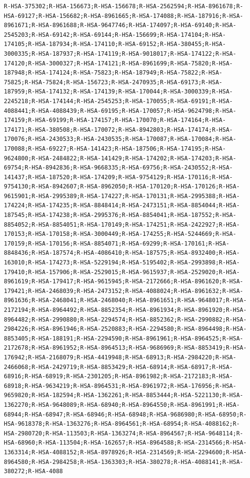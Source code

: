 \documentclass[
  letterpaper,
  DIV=11,
  numbers=noendperiod]{scrartcl}
\begin{document}
\begin{verbatim}
R-HSA-375302;R-HSA-156673;R-HSA-156678;R-HSA-2562594;R-HSA-8961678;R-HSA-69127;R-HSA-156682;R-HSA-8961665;R-HSA-174088;R-HSA-187916;R-HSA-8961671;R-HSA-8961688;R-HSA-9647746;R-HSA-174097;R-HSA-69140;R-HSA-2545203;R-HSA-69142;R-HSA-69144;R-HSA-156699;R-HSA-174104;R-HSA-174105;R-HSA-187934;R-HSA-174110;R-HSA-69152;R-HSA-380455;R-HSA-3000335;R-HSA-187937;R-HSA-174119;R-HSA-9018017;R-HSA-174122;R-HSA-174120;R-HSA-3000327;R-HSA-174121;R-HSA-8961699;R-HSA-75820;R-HSA-187948;R-HSA-174124;R-HSA-75823;R-HSA-187949;R-HSA-75822;R-HSA-75825;R-HSA-75824;R-HSA-156723;R-HSA-2470935;R-HSA-69173;R-HSA-187959;R-HSA-174132;R-HSA-174139;R-HSA-170044;R-HSA-3000339;R-HSA-2245218;R-HSA-174144;R-HSA-2545253;R-HSA-170055;R-HSA-69191;R-HSA-4088441;R-HSA-4088439;R-HSA-69195;R-HSA-170057;R-HSA-9624798;R-HSA-174159;R-HSA-69199;R-HSA-174157;R-HSA-170070;R-HSA-174164;R-HSA-174171;R-HSA-380508;R-HSA-170072;R-HSA-8942803;R-HSA-174174;R-HSA-170076;R-HSA-2430533;R-HSA-2430535;R-HSA-170087;R-HSA-170084;R-HSA-170088;R-HSA-69227;R-HSA-141423;R-HSA-187506;R-HSA-174195;R-HSA-9624800;R-HSA-2484822;R-HSA-141429;R-HSA-174202;R-HSA-174203;R-HSA-69754;R-HSA-8942836;R-HSA-9668335;R-HSA-69756;R-HSA-2430552;R-HSA-141437;R-HSA-187520;R-HSA-174209;R-HSA-9754129;R-HSA-170116;R-HSA-9754130;R-HSA-8942607;R-HSA-8962050;R-HSA-170120;R-HSA-170126;R-HSA-9615901;R-HSA-2995389;R-HSA-174227;R-HSA-170131;R-HSA-2995388;R-HSA-174224;R-HSA-174235;R-HSA-8848414;R-HSA-2473151;R-HSA-8854044;R-HSA-187545;R-HSA-174238;R-HSA-2995376;R-HSA-8854041;R-HSA-187552;R-HSA-8854052;R-HSA-8854051;R-HSA-170149;R-HSA-174251;R-HSA-2422927;R-HSA-170153;R-HSA-170158;R-HSA-3000449;R-HSA-174255;R-HSA-5244669;R-HSA-170159;R-HSA-170156;R-HSA-8854071;R-HSA-69299;R-HSA-170161;R-HSA-8848436;R-HSA-187574;R-HSA-4086410;R-HSA-187575;R-HSA-8932400;R-HSA-163010;R-HSA-174273;R-HSA-5229194;R-HSA-5195402;R-HSA-2993898;R-HSA-179410;R-HSA-157906;R-HSA-2529015;R-HSA-9615937;R-HSA-2529020;R-HSA-8961619;R-HSA-179417;R-HSA-9615945;R-HSA-2172666;R-HSA-8961620;R-HSA-179421;R-HSA-2468039;R-HSA-2473152;R-HSA-4088024;R-HSA-8961632;R-HSA-8961636;R-HSA-2468041;R-HSA-2468040;R-HSA-8961651;R-HSA-9648017;R-HSA-2172194;R-HSA-8964492;R-HSA-8852354;R-HSA-8961934;R-HSA-8961920;R-HSA-8964482;R-HSA-2990880;R-HSA-2294574;R-HSA-8852362;R-HSA-2990882;R-HSA-2984226;R-HSA-8961946;R-HSA-2520883;R-HSA-2294580;R-HSA-8964498;R-HSA-8853405;R-HSA-188191;R-HSA-2294590;R-HSA-8961961;R-HSA-8964525;R-HSA-2172678;R-HSA-8961952;R-HSA-8964513;R-HSA-9686969;R-HSA-8853419;R-HSA-176942;R-HSA-2168079;R-HSA-4419948;R-HSA-68913;R-HSA-2984220;R-HSA-2466068;R-HSA-2429719;R-HSA-8853429;R-HSA-68914;R-HSA-68917;R-HSA-68916;R-HSA-68919;R-HSA-2301205;R-HSA-8961982;R-HSA-2172183;R-HSA-68918;R-HSA-9634219;R-HSA-8964531;R-HSA-8961972;R-HSA-176956;R-HSA-9659820;R-HSA-182594;R-HSA-1362261;R-HSA-8853444;R-HSA-5221130;R-HSA-1362270;R-HSA-9648089;R-HSA-68940;R-HSA-8964550;R-HSA-8961991;R-HSA-68944;R-HSA-68947;R-HSA-68946;R-HSA-68948;R-HSA-9686980;R-HSA-68950;R-HSA-9618378;R-HSA-1363276;R-HSA-8964561;R-HSA-68954;R-HSA-4088162;R-HSA-2980720;R-HSA-113503;R-HSA-1363274;R-HSA-8964567;R-HSA-9648114;R-HSA-68960;R-HSA-113504;R-HSA-162657;R-HSA-8964588;R-HSA-2314566;R-HSA-1363314;R-HSA-4088152;R-HSA-8978926;R-HSA-2314569;R-HSA-2294600;R-HSA-8964580;R-HSA-2984258;R-HSA-1363303;R-HSA-380278;R-HSA-4088141;R-HSA-380272;R-HSA-4088
\end{verbatim}
\end{document}

